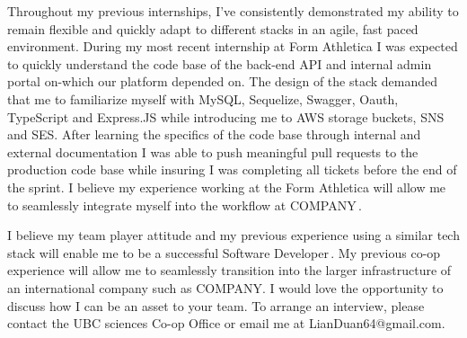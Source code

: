 \documentclass[11pt, a4paper]{awesome-cv}
\newcommand{\company}{COMPANY}
\newcommand{\companyName}{\company\,}
\newcommand{\postionName}{ Software Developer\,}
\begin{document}
\begin{cvletter}
\setlength\parindent{24pt} Throughout my previous internships, I've consistently demonstrated my ability to remain flexible and quickly adapt to different stacks in an agile, fast paced environment. During my most recent internship at Form Athletica I was expected to quickly understand the code base of the back-end API and internal admin portal on-which our platform depended on. The design of the stack demanded that me to familiarize myself with MySQL, Sequelize, Swagger, Oauth, TypeScript and Express.JS while introducing me to AWS storage buckets, SNS and SES. After learning the specifics of the code base through internal and external documentation I was able to push meaningful pull requests to the production code base while insuring I was completing all tickets before the end of the sprint. I believe my experience working at the Form Athletica will allow me to seamlessly integrate myself into the workflow at \companyName. 


\setlength\parindent{24pt} I believe my team player attitude and my previous experience using a similar tech stack will enable me to be a successful \postionName. My previous co-op experience will allow me to seamlessly transition into the larger infrastructure of an international company such as \company. I would love the opportunity to discuss how I can be an asset to your team. To arrange an interview, please contact the UBC sciences Co-op Office or email me at LianDuan64@gmail.com. 


\end{cvletter}
\\
\\
\makeletterclosing
\end{document}
